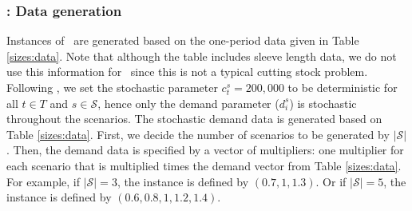 
\subsubsection{\sizes: Data generation}
Instances of \sizes\ are generated based on the one-period data given in Table \ref{sizes:data}. Note that although the table includes sleeve length data, we do not use this information for \sizes\ since this is not a typical cutting stock problem. Following \cite{journal:JSW1999}, we set the stochastic parameter $c_t^s=200,000$ to be deterministic for all $t\in T$ and $s\in\mathcal{S}$, hence only the demand parameter ($d_i^s$) is stochastic throughout the scenarios. The stochastic demand data is generated based on Table \ref{sizes:data}. First, we decide the number of scenarios to be generated by $|\mathcal{S}|$. Then, the demand data is specified by a vector of multipliers: one multiplier for each scenario that is multiplied times the demand vector from Table \ref{sizes:data}. For example, if $|\mathcal{S}|=3$, the instance is defined by $(0.7,1,1.3)$. Or if $|\mathcal{S}|=5$, the instance is defined by $(0.6,0.8,1,1.2,1.4)$. %

